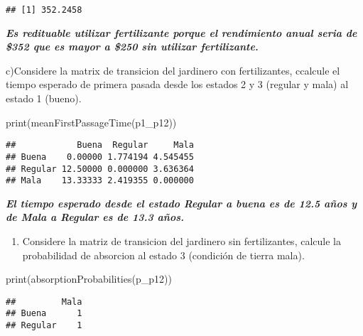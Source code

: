 \documentclass[
]{article}
\newenvironment{Shaded}{\begin{snugshade}}{\end{snugshade}}
\newcommand{\FunctionTok}[1]{\textcolor[rgb]{0.00,0.00,0.00}{#1}}
\newcommand{\NormalTok}[1]{#1}
\providecommand{\tightlist}{%
  \setlength{\itemsep}{0pt}\setlength{\parskip}{0pt}}
\begin{document}
\begin{verbatim}
## [1] 352.2458
\end{verbatim}

\textbf{\emph{Es redituable utilizar fertilizante porque el rendimiento
anual seria de \$352 que es mayor a \$250 sin utilizar fertilizante.}}

c)Considere la matrix de transicion del jardinero con fertilizantes,
ccalcule el tiempo esperado de primera pasada desde los estados 2 y 3
(regular y mala) al estado 1 (bueno).

\begin{Shaded}
\begin{Highlighting}[]
\FunctionTok{print}\NormalTok{(}\FunctionTok{meanFirstPassageTime}\NormalTok{(p1\_p12))}
\end{Highlighting}
\end{Shaded}

\begin{verbatim}
##            Buena  Regular     Mala
## Buena    0.00000 1.774194 4.545455
## Regular 12.50000 0.000000 3.636364
## Mala    13.33333 2.419355 0.000000
\end{verbatim}

\textbf{\emph{El tiempo esperado desde el estado Regular a buena es de
12.5 años y de Mala a Regular es de 13.3 años.}}

\begin{enumerate}
\def\labelenumi{\alph{enumi})}
\setcounter{enumi}{3}
\tightlist
\item
  Considere la matriz de transicion del jardinero sin fertilizantes,
  calcule la probabilidad de absorcion al estado 3 (condición de tierra
  mala).
\end{enumerate}

\begin{Shaded}
\begin{Highlighting}[]
\FunctionTok{print}\NormalTok{(}\FunctionTok{absorptionProbabilities}\NormalTok{(p\_p12))}
\end{Highlighting}
\end{Shaded}

\begin{verbatim}
##         Mala
## Buena      1
## Regular    1
\end{verbatim}
\end{document}
